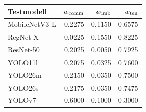 \begin{tabular}{@{}lrrr@{}}
\toprule
Testmodell & $w_{\rm comm}$ & $w_{\rm imb}$ & $w_{\rm ten}$ \\
\midrule
MobileNetV3-L & 0.2275 & 0.1150 & 0.6575 \\
RegNet-X & 0.0225 & 0.1550 & 0.8225 \\
ResNet-50 & 0.2025 & 0.0050 & 0.7925 \\
YOLO11l & 0.2075 & 0.0325 & 0.7600 \\
YOLO26m & 0.2150 & 0.0350 & 0.7500 \\
YOLO26s & 0.2175 & 0.0350 & 0.7475 \\
YOLOv7 & 0.6000 & 0.1000 & 0.3000 \\
\bottomrule
\end{tabular}
